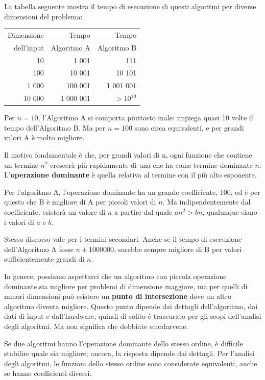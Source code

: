 \documentclass[10pt]{book}
\begin{document}
La tabella seguente mostra il tempo di esecuzione di questi algoritmi per diverse dimensioni del problema:

\begin{tabular}{|r|r|r|}
\hline
Dimensione &   Tempo          & Tempo \\
dell'input	   &   Algoritmo A    & Algoritmo B \\
\hline
10        &   1 001           & 111         \\
100       &   10 001          & 10 101         \\
1 000     &   100 001         & 1 001 001         \\
10 000    &   1 000 001       & $> 10^{10}$         \\
\hline
\end{tabular}

Per $n=10$, l'Algoritmo A si comporta piuttosto male: impiega quasi 10 volte il tempo dell'Algoritmo B.  Ma per $n=100$ sono circa equivalenti, e per grandi valori A è molto migliore.

Il motivo fondamentale è che, per grandi valori di n, ogni funzione che contiene un termine $n^2$ crescerà più rapidamente di una che ha come termine dominante $n$. L'{\bf operazione dominante} è quella relativa al termine con il più alto esponente.

Per l'algoritmo A, l'operazione dominante ha un grande coefficiente, 100, ed è per questo che B è migliore di A per piccoli valori di $n$.  Ma indipendentemente dal coefficiente, esisterà un valore di $n$ a partire dal quale
$a n^2 > b n$, qualunque siano i valori di $a$ e $b$.

Stesso discorso vale per i termini secondari. Anche se il tempo di esecuzione dell'Algoritmo A fosse $n+1000000$, sarebbe sempre migliore di B per valori sufficientemente grandi di $n$.

In genere, possiamo aspettarci che un algoritmo con piccola operazione dominante sia migliore per problemi di dimensione maggiore, ma per quelli di minori dimensioni può esistere un {\bf punto di intersezione} dove un altro algoritmo diventa migliore. Questo punto dipende dai dettagli dell'algoritmo, dai dati di input e dall'hardware, quindi di solito è trascurato per gli scopi dell'analisi degli algoritmi. Ma non significa che dobbiate scordarvene.

Se due algoritmi hanno l'operazione dominante dello stesso ordine, è difficile stabilire quale sia migliore; ancora, la risposta dipende dai dettagli. Per l'analisi degli algoritmi, le funzioni dello stesso ordine sono considerate equivalenti, anche se hanno coefficienti diversi.
\end{document}
